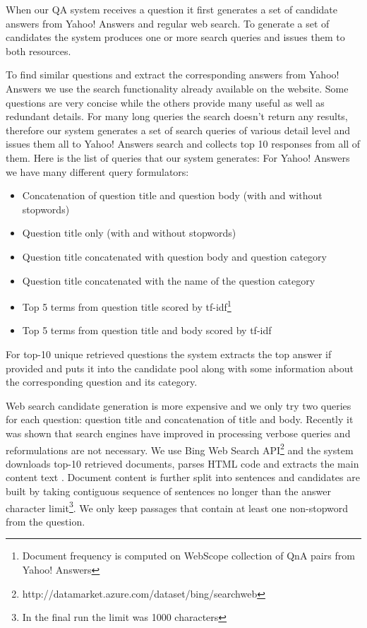 \documentclass[]{article}
\begin{document}
When our QA system receives a question it first generates a set of candidate answers from Yahoo! Answers and regular web search.
To generate a set of candidates the system produces one or more search queries and issues them to both resources.

To find similar questions and extract the corresponding answers from Yahoo! Answers we use the search functionality already available on the website.
Some questions are very concise while the others provide many useful as well as redundant details.
For many long queries the search doesn't return any results, therefore our system generates a set of search queries of various detail level and issues them all to Yahoo! Answers search and collects top 10 responses from all of them.
Here is the list of queries that our system generates:
For Yahoo! Answers we have many different query formulators:
\begin{itemize}
	\setlength\itemsep{0mm}
	\item Concatenation of question title and question body (with and without stopwords)
	\item Question title only (with and without stopwords)
	\item Question title concatenated with question body and question category
	\item Question title concatenated with the name of the question category
	\item Top 5 terms from question title scored by tf-idf\footnote{Document frequency is computed on WebScope collection of QnA pairs from Yahoo! Answers}
	\item Top 5 terms from question title and body scored by tf-idf
\end{itemize}

For top-10 unique retrieved questions the system extracts the top answer if provided and puts it into the candidate pool along with some information about the corresponding question and its category.

Web search candidate generation is more expensive and we only try two queries for each question: question title and concatenation of title and body.
Recently it was shown \cite{askmsr_plus15} that search engines have improved in processing verbose queries and reformulations are not necessary.
We use Bing Web Search API\footnote{http://datamarket.azure.com/dataset/bing/searchweb} and the system downloads top-10 retrieved documents, parses HTML code and extracts the main content text \cite{Kohlschutter_2010}.
Document content is further split into sentences \cite{manning2014stanford} and candidates are built by taking contiguous sequence of sentences no longer than the answer character limit\footnote{In the final run the limit was 1000 characters}.
We only keep passages that contain at least one non-stopword from the question.
\end{document}
